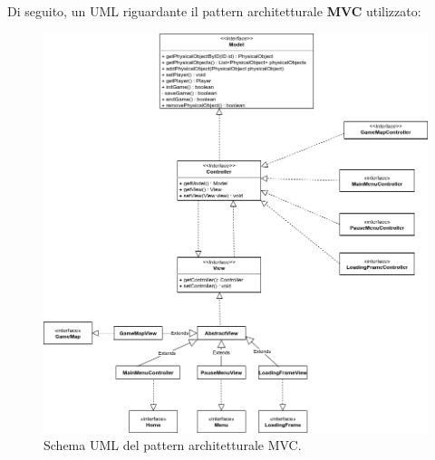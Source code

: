 \textsf{\small Di seguito, un UML riguardante il pattern architetturale \textbf{MVC} utilizzato:}\\

\begin{figure}[htp]
	\includegraphics[width=1.2\linewidth]{./img/mvc.png}
	\caption{Schema UML del pattern architetturale MVC.}
	\label{img:mvc}
\end{figure}


